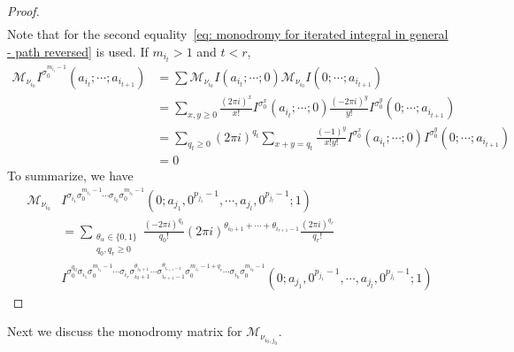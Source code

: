 \begin{proof}
\begin{equation}
\begin{aligned}
\end{aligned}
\end{equation}
Note that for the second equality~\eqref{eq: monodromy for iterated integral in general - path reversed} is used. If $m_{i_t}>1$ and $t<r$,
\begin{equation}
\begin{aligned}
\mathcal M_{\nu_{i_0}}I^{\sigma_0^{m_{i_t}-1}}(a_{i_t};\cdots;a_{i_{t+1}})&=\sum\mathcal M_{\nu_{i_0}}I(a_{i_t};\cdots;0)\mathcal M_{\nu_{i_0}}I(0;\cdots;a_{i_{t+1}})\\
&=\sum_{x,y\geq0}\frac{(2\pi i)^x}{x!}I^{\sigma_0^x}(a_{i_t};\cdots;0)\frac{(-2\pi i)^y}{y!}I^{\sigma_0^y}(0;\cdots;a_{i_{t+1}})\\
&=\sum_{q_t\geq0}(2\pi i)^{q_t}\sum_{x+y=q_t}\frac{(-1)^y}{x!y!}I^{\sigma_0^x}(a_{i_t};\cdots;0)I^{\sigma_0^y}(0;\cdots;a_{i_{t+1}})\\
&=0
\end{aligned}
\end{equation}
To summarize, we have
\begin{equation}
\begin{aligned}
\mathcal M_{\nu_{i_0}}&I^{\sigma_{i_1}\sigma_0^{m_{i_1}-1}\cdots\sigma_{i_k}\sigma_0^{m_{i_k}-1}}(0;a_{j_1},0^{p_{j_1}-1},\cdots,a_{j_l},0^{p_{j_l}-1};1)\\
&=\sum_{\substack{\theta_\alpha\in\{0,1\}\\q_0,q_r\geq0}}\frac{(-2\pi i)^{q_0}}{q_0!}(2\pi i)^{\theta_{i_0+1}+\cdots+\theta_{i_{r+1}-1}}\frac{(2\pi i)^{q_r}}{q_r!}\\
&I^{\sigma_0^{q_0}\sigma_{i_1}\sigma_0^{m_{i_1}-1}\cdots\sigma_{i_r}\sigma_{i_0+1}^{\theta_{i_0+1}}\cdots\sigma_{i_{r+1}-1}^{\theta_{i_{r+1}-1}}\sigma_0^{m_{i_r}-1+q_r}\cdots\sigma_{i_k}\sigma_0^{m_{i_k}-1}}(0;a_{j_1},0^{p_{j_1}-1},\cdots,a_{j_l},0^{p_{j_l}-1};1)
\end{aligned}
\end{equation}
\end{proof}

Next we discuss the monodromy matrix for $\mathcal M_{\nu_{i_0,j_0}}$.

